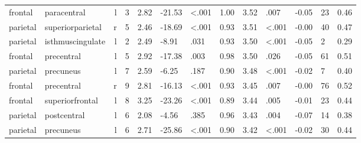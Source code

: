 \documentclass{article}
\begin{document}
\begin{longtable}{llrR{1.3cm}R{1cm}R{1.3cm}R{1cm}R{1cm}R{1.3cm}R{1cm}R{1.8cm}R{1.3cm}R{1.8cm}}
   frontal &               paracentral &    l &         3 &                  2.82 &           -21.53 &      \textless.001 &                               1.00 &                          3.52 &                            .007 &  -0.05 &     23 &      0.46 \\
  parietal &          superiorparietal &    r &         5 &                  2.46 &           -18.69 &      \textless.001 &                               0.93 &                          3.51 &                   \textless.001 &  -0.00 &     40 &      0.47 \\
  parietal &          isthmuscingulate &    l &         2 &                  2.49 &            -8.91 &               .031 &                               0.93 &                          3.50 &                   \textless.001 &  -0.05 &      2 &      0.29 \\
   frontal &                precentral &    l &         5 &                  2.92 &           -17.38 &               .003 &                               0.98 &                          3.50 &                            .026 &  -0.05 &     61 &      0.51 \\
  parietal &                 precuneus &    l &         7 &                  2.59 &            -6.25 &               .187 &                               0.90 &                          3.48 &                   \textless.001 &  -0.02 &      7 &      0.40 \\
   frontal &                precentral &    r &         9 &                  2.81 &           -16.13 &      \textless.001 &                               0.93 &                          3.45 &                            .007 &  -0.00 &     76 &      0.52 \\
   frontal &           superiorfrontal &    l &         8 &                  3.25 &           -23.26 &      \textless.001 &                               0.89 &                          3.44 &                            .005 &  -0.01 &     23 &      0.44 \\
  parietal &               postcentral &    l &         6 &                  2.08 &            -4.56 &               .385 &                               0.96 &                          3.43 &                            .004 &  -0.07 &     14 &      0.38 \\
  parietal &                 precuneus &    l &         6 &                  2.71 &           -25.86 &      \textless.001 &                               0.90 &                          3.42 &                   \textless.001 &  -0.02 &     30 &      0.44 \\

\end{longtable}
\end{document}
